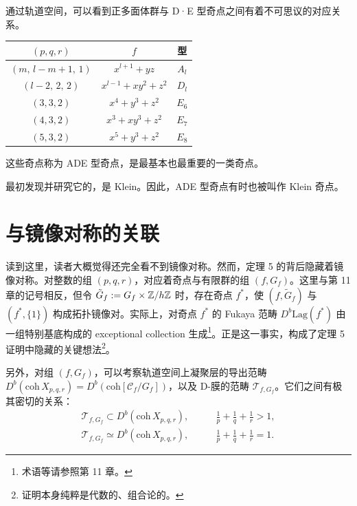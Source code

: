 通过轨道空间，可以看到正多面体群与 D·E 型奇点之间有着不可思议的对应关系。
\begin{table}[htbp]
  \centering
  \begin{tabular}{ccc}
    \toprule
    $(p,q,r)$ & $f$ & 型\\
    \midrule
    $(m,\,l-m+1,\,1)$ & $x^{l+1}+yz$ & $A_l$\\
    $(l-2,\,2,\,2)$ & $x^{l-1}+xy^2+z^2$ & $D_l$\\
    $(3,3,2)$ & $x^4+y^3+z^2$ & $E_6$\\
    $(4,3,2)$ & $x^3+xy^3+z^2$ & $E_7$\\
    $(5,3,2)$ & $x^5+y^3+z^2$ & $E_8$\\
    \bottomrule
  \end{tabular}
\end{table}%
这些奇点称为 ADE 型奇点，是最基本也最重要的一类奇点。

最初发现并研究它的，是 Klein。因此，ADE 型奇点有时也被叫作 Klein 奇点。

\section{与镜像对称的关联}

读到这里，读者大概觉得还完全看不到镜像对称。然而，定理 5 的背后隐藏着镜像对称。对整数的组 $(p,q,r)$，对应着奇点与有限群的组 $(f,G_f)$。这里与第 11 章的记号相反，但令 $\tilde G_f:=G_f\times\mathbb{Z}/h\mathbb{Z}$ 时，存在奇点 $f^*$，使 $(f,\tilde G_f)$ 与 $(f^*,\{1\})$ 构成拓扑镜像对。实际上，对奇点 $f^*$ 的 Fukaya 范畴 $D^b\mathrm{Lag}(f^*)$ 由一组特别基底构成的 exceptional collection 生成\footnote{术语等请参照第 11 章。}。正是这一事实，构成了定理 5 证明中隐藏的关键想法\footnote{证明本身纯粹是代数的、组合论的。}。

另外，对组 $(f,G_f)$，可以考察轨道空间上凝聚层的导出范畴 $D^b(\mathrm{coh}\,X_{p,q,r})=D^b(\mathrm{coh}[\mathcal{C}_f/G_f])$，以及 D-膜的范畴 $\mathcal{T}_{f,G_f}$。它们之间有极其密切的关系：
\begin{align*}
  \mathcal{T}_{f,G_f} \subset D^b(\mathrm{coh}\,X_{p,q,r}), &\qquad \frac{1}{p}+\frac{1}{q}+\frac{1}{r}>1,\\
  \mathcal{T}_{f,G_f} \simeq D^b(\mathrm{coh}\,X_{p,q,r}), &\qquad \frac{1}{p}+\frac{1}{q}+\frac{1}{r}=1.
\end{align*}

